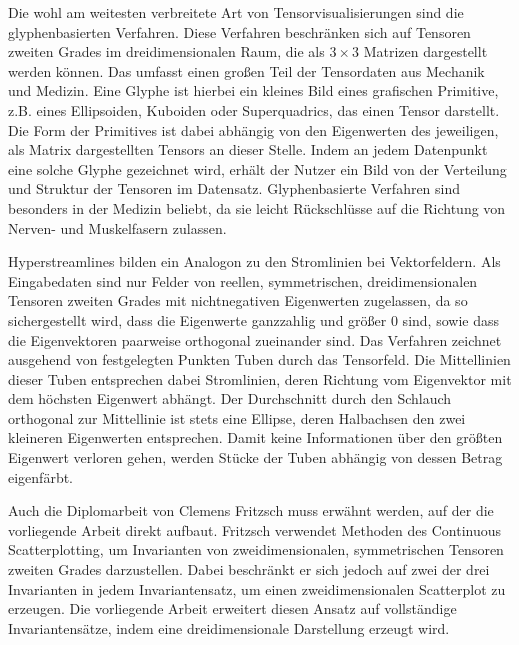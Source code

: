 \documentclass[a4paper,fontsize=12pt,toc=bib,parskip=half,ngerman]{scrartcl}
\begin{document}
Die wohl am weitesten verbreitete Art von Tensorvisualisierungen sind die glyphenbasierten Verfahren. Diese Verfahren beschr\"anken sich auf Tensoren zweiten Grades im dreidimensionalen Raum, die als $3\times3$ Matrizen dargestellt werden k\"onnen. Das umfasst einen gro{\ss}en Teil der Tensordaten aus Mechanik und Medizin. Eine Glyphe ist hierbei ein kleines Bild eines grafischen Primitive, z.B. eines Ellipsoiden, Kuboiden oder Superquadrics\cite{kindlmann2004superquadric}, das einen Tensor darstellt. Die Form der Primitives ist dabei abh\"angig von den Eigenwerten des jeweiligen, als Matrix dargestellten Tensors an dieser Stelle. Indem an jedem Datenpunkt eine solche Glyphe gezeichnet wird, erh\"alt der Nutzer ein Bild von der Verteilung und Struktur der Tensoren im Datensatz. Glyphenbasierte Verfahren sind besonders in der Medizin beliebt, da sie leicht R\"uckschl\"usse auf die Richtung von Nerven- und Muskelfasern zulassen.

Hyperstreamlines\cite{delmarcelle1993visualizing} bilden ein Analogon zu den Stromlinien bei Vektorfeldern. Als Eingabedaten sind nur Felder von reellen, symmetrischen, dreidimensionalen Tensoren zweiten Grades mit nichtnegativen Eigenwerten zugelassen, da so sichergestellt wird, dass die Eigenwerte ganzzahlig und gr\"o{\ss}er 0 sind, sowie dass die Eigenvektoren paarweise orthogonal zueinander sind. Das Verfahren zeichnet ausgehend von festgelegten Punkten Tuben durch das Tensorfeld. Die Mittellinien dieser Tuben entsprechen dabei Stromlinien, deren Richtung vom Eigenvektor mit dem h\"ochsten Eigenwert abh\"angt. Der Durchschnitt durch den Schlauch orthogonal zur Mittellinie ist stets eine Ellipse, deren Halbachsen den zwei kleineren Eigenwerten entsprechen. Damit keine Informationen \"uber den gr\"o{\ss}ten Eigenwert verloren gehen, werden St\"ucke der Tuben abh\"angig von dessen Betrag eigenf\"arbt.

Auch die Diplomarbeit von Clemens Fritzsch\cite{fritzsch2016continuousScatterplot} muss erw\"ahnt werden, auf der die vorliegende Arbeit direkt aufbaut. Fritzsch verwendet Methoden des Continuous Scatterplotting, um Invarianten von zweidimensionalen, symmetrischen Tensoren zweiten Grades darzustellen. Dabei beschr\"ankt er sich jedoch auf zwei der drei Invarianten in jedem Invariantensatz, um einen zweidimensionalen Scatterplot zu erzeugen. Die vorliegende Arbeit erweitert diesen Ansatz auf vollst\"andige Invariantens\"atze, indem eine dreidimensionale Darstellung erzeugt wird.
\end{document}
